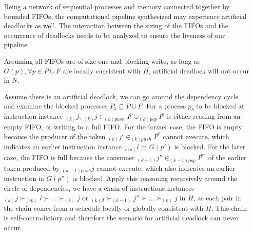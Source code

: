 Being a network of sequential processes and memory connected together by
bounded FIFOs, the computational pipeline synthesized may experience
artificial deadlocks as well. The interaction between the sizing of the FIFOs 
and the occurrence of deadlocks needs to be analyzed to ensure the liveness
of our pipeline.

\begin{lemma}
\label{nondeadlock}
Assuming 
all FIFOs are of size one and blocking write,
as long as $G(p), \forall p \in P \cup F$ are locally consistent with $H$,
artificial deadlock will not occur in $N$. 
\end{lemma}

Assume there is an artificial deadlock, we can go around the dependency
cycle and examine the blocked processes $P_b \subseteq P \cup F$. For a process $p_b$
to be blocked at instruction instance $_{(k)}j$, $_{(k)}j \in _{(k)push}{I^p} \cup _{(k)pop}{I^p}$ is either reading from an empty
FIFO, or writing to a full FIFO. For the former case, the FIFO is empty because the producer of the token
$_{(k)}j' \in _{(k)push}I^{p'}$ cannot execute, which indicates an earlier instruction 
instance $_{(m)}l$ in $G(p')$ is blocked. For the later case, the FIFO is full because the consumer $_{(k-1)}j'' \in _{(k-1)pop}I^{p''}$ of the earlier token produced by
$_{(k-1)push}j$ cannot execute, which also indicates an earlier instruction in $G(p'')$
is blocked. Apply this reasoning recursively around the circle of dependencies,
we have a chain of instructions instances $_{(k)}j \succ _{(m)}l \succ ... \succ _{(k)}j$
or $_{(k)}j \succ _{(k-1)}j'' \succ ... \succ _{(k)}j$ in $H$, as each pair in the chain
comes from a schedule locally or globally consistent with $H$. This chain is self-contradictory
and therefore the scenario for artificial deadlock can never occur. 

